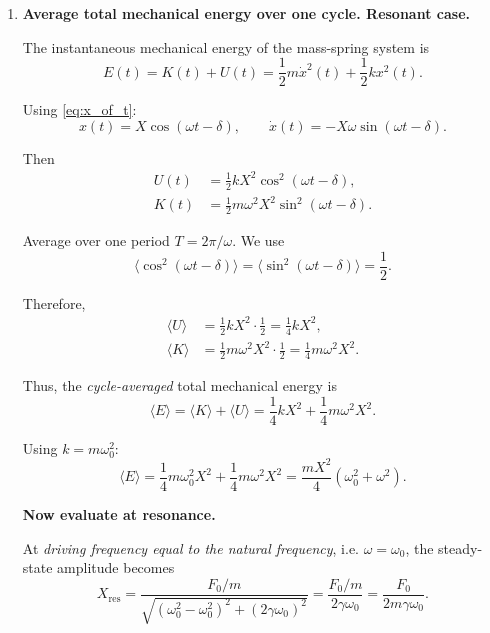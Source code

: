 \documentclass[12pt]{article}
\begin{document}
\begin{enumerate}

\item \textbf{Average total mechanical energy over one cycle. Resonant case.}

The instantaneous mechanical energy of the mass-spring system is
\begin{equation}
E(t) = K(t) + U(t)
= \frac{1}{2} m \dot{x}^2(t) + \frac{1}{2} k x^2(t).
\label{eq:Et}
\end{equation}

Using \eqref{eq:x_of_t}:
\[
x(t) = X \cos(\omega t - \delta),
\qquad
\dot{x}(t) = -X \omega \sin(\omega t - \delta).
\]

Then
\begin{align}
U(t) &= \frac{1}{2} k X^2 \cos^2(\omega t - \delta), \\
K(t) &= \frac{1}{2} m \omega^2 X^2 \sin^2(\omega t - \delta).
\end{align}

Average over one period $T = 2\pi/\omega$.
We use
\[
\langle \cos^2(\omega t - \delta) \rangle = \langle \sin^2(\omega t - \delta) \rangle = \frac{1}{2}.
\]

Therefore,
\begin{align}
\langle U \rangle 
&= \frac{1}{2} k X^2 \cdot \frac{1}{2}
= \frac{1}{4} k X^2, \\
\langle K \rangle
&= \frac{1}{2} m \omega^2 X^2 \cdot \frac{1}{2}
= \frac{1}{4} m \omega^2 X^2.
\end{align}

Thus, the \emph{cycle-averaged} total mechanical energy is
\begin{equation}
\langle E \rangle
= \langle K \rangle + \langle U \rangle
= \frac{1}{4} k X^2 + \frac{1}{4} m \omega^2 X^2.
\label{eq:avgE_general}
\end{equation}

Using $k = m \omega_0^2$:
\begin{equation}
\langle E \rangle
= \frac{1}{4} m \omega_0^2 X^2 + \frac{1}{4} m \omega^2 X^2
= \frac{m X^2}{4} (\omega_0^2 + \omega^2).
\label{eq:avgE_simplified}
\end{equation}

\textbf{Now evaluate at resonance.}

At \emph{driving frequency equal to the natural frequency}, i.e. $\omega = \omega_0$, the steady-state amplitude becomes
\[
X_\text{res}
= \frac{F_0/m}{\sqrt{(\omega_0^2 - \omega_0^2)^2 + (2\gamma \omega_0)^2}}
= \frac{F_0/m}{2\gamma \omega_0}
= \frac{F_0}{2 m \gamma \omega_0}.
\]


\end{enumerate}
\end{document}
